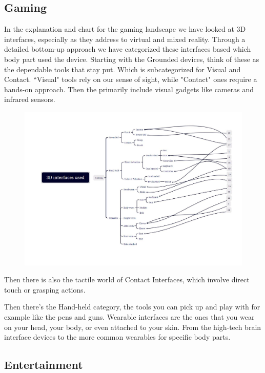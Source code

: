 \subsection{Gaming}
\label{gaming}


In the explanation and chart for the gaming landscape we have looked at 3D interfaces, especially as they address to virtual and mixed reality. Through a detailed bottom-up approach we have categorized these interfaces based which body part used the device. 
Starting with the Grounded devices, think of these as the dependable tools that stay put. Which is subcategorized for Visual and Contact. “Visual" tools rely on our sense of sight, while "Contact" ones require a hands-on approach. Then the primarily include visual gadgets like cameras and infrared sensors. 

\begin{figure}[htbp]
	\includegraphics[width=\columnwidth]{figures/gaming.pdf}
	\label{fig:gaming}
\end{figure}

Then there is also the tactile world of Contact Interfaces, which involve direct touch or grasping actions. 

Then there's the Hand-held category, the tools you can pick up and play with for example like the pens and guns. Wearable interfaces are the ones that you wear on your head, your body, or even attached to your skin. From the high-tech brain interface devices to the more common wearables for specific body parts.

\subsection{Entertainment}
\label{entertainment}

